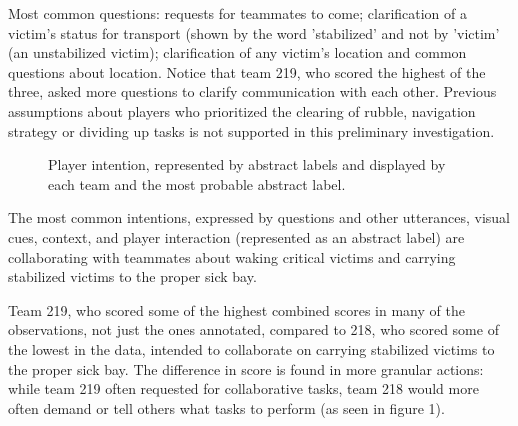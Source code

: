 Most common questions: requests for teammates to come; clarification of a victim's status for transport (shown by the word 'stabilized' and not by 'victim' (an unstabilized victim); clarification of any victim's location and common questions about location.
Notice that team 219, who scored the highest of the three, asked more questions to clarify communication with each other. Previous assumptions about players who prioritized the clearing of rubble, navigation strategy or dividing up tasks is not supported in this preliminary investigation.


\vspace{30pt}

\begin{figure}[h!]
    \centering
    \caption{Player intention, represented by abstract labels and displayed by each team and the most probable abstract label. }
\end{figure}

The most common intentions, expressed by questions and other utterances, visual cues, context, and player interaction (represented as an abstract label) are collaborating with teammates about waking critical victims and carrying stabilized victims to the proper sick bay. 

Team 219, who scored some of the highest combined scores in many of the observations, not just the ones annotated, compared to 218, who scored some of the lowest in the data, intended to collaborate on carrying stabilized victims to the proper sick bay. The difference in score is found in more granular actions: while team 219 often requested for collaborative tasks, team 218 would more often demand or tell others what tasks to perform (as seen in figure 1).

\clearpage



